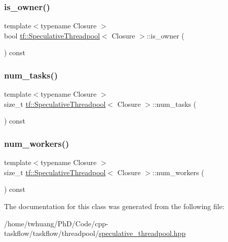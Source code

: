 \subsubsection{\texorpdfstring{is\+\_\+owner()}{is\_owner()}}
{\footnotesize\ttfamily template$<$typename Closure $>$ \\
bool \hyperlink{classtf_1_1SpeculativeThreadpool}{tf\+::\+Speculative\+Threadpool}$<$ Closure $>$\+::is\+\_\+owner (\begin{DoxyParamCaption}{ }\end{DoxyParamCaption}) const}

\mbox{\label{classtf_1_1SpeculativeThreadpool_a8ab5c571a1aa8eb5852a5785c611542b}} 
\subsubsection{\texorpdfstring{num\+\_\+tasks()}{num\_tasks()}}
{\footnotesize\ttfamily template$<$typename Closure $>$ \\
size\+\_\+t \hyperlink{classtf_1_1SpeculativeThreadpool}{tf\+::\+Speculative\+Threadpool}$<$ Closure $>$\+::num\+\_\+tasks (\begin{DoxyParamCaption}{ }\end{DoxyParamCaption}) const}

\mbox{\label{classtf_1_1SpeculativeThreadpool_afc59dc19c9029bee4a4e4d135737319d}} 
\subsubsection{\texorpdfstring{num\+\_\+workers()}{num\_workers()}}
{\footnotesize\ttfamily template$<$typename Closure $>$ \\
size\+\_\+t \hyperlink{classtf_1_1SpeculativeThreadpool}{tf\+::\+Speculative\+Threadpool}$<$ Closure $>$\+::num\+\_\+workers (\begin{DoxyParamCaption}{ }\end{DoxyParamCaption}) const}



The documentation for this class was generated from the following file\+:\begin{DoxyCompactItemize}
\item 
/home/twhuang/\+Ph\+D/\+Code/cpp-\/taskflow/taskflow/threadpool/\hyperlink{speculative__threadpool_8hpp}{speculative\+\_\+threadpool.\+hpp}\end{DoxyCompactItemize}
